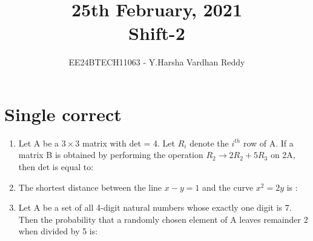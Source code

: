 \documentclass[journal,,12pt,onecolumn]{IEEEtran}
\theoremstyle{remark}
\begin{document}

\vspace{3cm}

\title{25th February, 2021\\Shift-2}
\author{EE24BTECH11063 - Y.Harsha Vardhan Reddy}
\maketitle

\bigskip

\renewcommand{\thefigure}{\theenumi}
\renewcommand{\thetable}{\theenumi}

\section*{Single correct}
\begin{enumerate}
    \item Let A be a $3 \times 3$ matrix with det = 4. Let $R_i$ denote the $i^{th}$ row of A. If a matrix B is obtained by performing the operation $R_2 \rightarrow 2R_2 + 5R_3$ on 2A, then det is equal to: 
    \begin{enumerate}
        \end{enumerate}
        \item The shortest distance between the line $x-y=1$ and the curve $x^2=2y$ is :
        \begin{enumerate}
        \end{enumerate}
\item Let A be a set of all 4-digit natural numbers whose exactly one digit is 7. Then the probability that a randomly chosen element of A leaves remainder 2 when divided by 5 is:
        \begin{enumerate}
        \begin{multicols}{4}

\end{multicols}
\end{enumerate}
\end{enumerate}
\end{document}
